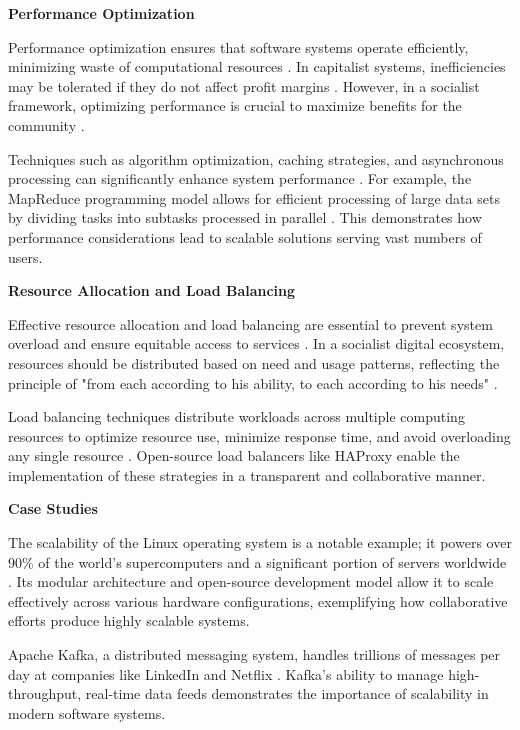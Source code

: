 \begin{refsection}
\textbf{Performance Optimization}

Performance optimization ensures that software systems operate efficiently, minimizing waste of computational resources \cite[pp.~50-52]{Sutter2005}. In capitalist systems, inefficiencies may be tolerated if they do not affect profit margins \cite[pp.~60-62]{Fuchs2014}. However, in a socialist framework, optimizing performance is crucial to maximize benefits for the community \cite[pp.~477-478]{Marx1867}.

Techniques such as algorithm optimization, caching strategies, and asynchronous processing can significantly enhance system performance \cite[pp.~75-77]{Cormen2009}. For example, the MapReduce programming model allows for efficient processing of large data sets by dividing tasks into subtasks processed in parallel \cite[pp.~107-109]{Dean2008}. This demonstrates how performance considerations lead to scalable solutions serving vast numbers of users.

\textbf{Resource Allocation and Load Balancing}

Effective resource allocation and load balancing are essential to prevent system overload and ensure equitable access to services \cite[pp.~120-122]{Tanenbaum2007}. In a socialist digital ecosystem, resources should be distributed based on need and usage patterns, reflecting the principle of "from each according to his ability, to each according to his needs" \cite[pp.~615]{Marx1875}.

Load balancing techniques distribute workloads across multiple computing resources to optimize resource use, minimize response time, and avoid overloading any single resource \cite[pp.~130-132]{Kopparapu2002}. Open-source load balancers like HAProxy enable the implementation of these strategies in a transparent and collaborative manner.

\textbf{Case Studies}

The scalability of the Linux operating system is a notable example; it powers over 90\% of the world's supercomputers and a significant portion of servers worldwide \cite[pp.~15-17]{LinuxFoundation2020}. Its modular architecture and open-source development model allow it to scale effectively across various hardware configurations, exemplifying how collaborative efforts produce highly scalable systems.

Apache Kafka, a distributed messaging system, handles trillions of messages per day at companies like LinkedIn and Netflix \cite[pp.~55-57]{Kreps2011}. Kafka's ability to manage high-throughput, real-time data feeds demonstrates the importance of scalability in modern software systems.


\end{refsection}
